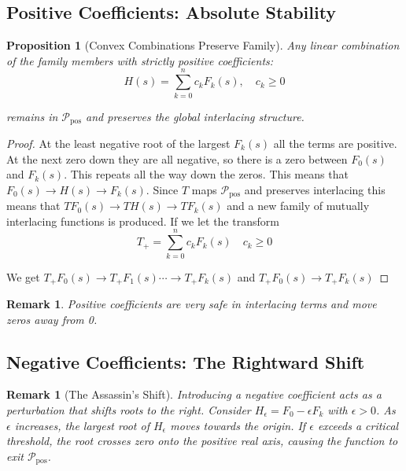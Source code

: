 \documentclass[11pt]{article}
\theoremstyle{breakdef}
\newtheorem{remark}[theorem]{Remark}
\newtheorem{proposition}[theorem]{Proposition}
\begin{document}
\subsection{Positive Coefficients: Absolute Stability}
\begin{proposition}[Convex Combinations Preserve Family]
Any linear combination of the family members with strictly positive coefficients:
\begin{equation}
H(s) = \sum_{k=0}^n c_k F_k(s), \quad c_k \ge 0
\end{equation}

remains in $\mathcal{P}_{\mathrm{pos}}$ and preserves the global interlacing structure.
\end{proposition}
\begin{proof}
At the least negative root of the largest $F_k(s)$ all the terms are positive.  At the next zero down they are all negative, so there is a zero between $F_0(s)$ and $F_k(s)$.  This repeats all the way down the zeros.  This means that $F_0(s) \to H(s) \to F_k(s)$.  Since $T$ maps $\mathcal{P}_{\mathrm{pos}}$ and preserves interlacing this means that $T F_0(s) \to T H(s) \to T F_k(s)$ and a new family of mutually interlacing functions is produced.  If we let the transform
\begin{equation}
T_{+} = \sum_{k=0}^n c_k F_k(s) \quad c_k \ge 0
\end{equation}

We get $T_{+} F_0(s) \to T_{+} F_1(s) \cdots \to T_{+} F_k(s)$
and  $T_{+} F_0(s) \to T_{+} F_k(s)$

\end{proof}
\begin{remark}
Positive coefficients are very safe in interlacing terms and move zeros away from 0.
\end{remark}

\subsection{Negative Coefficients: The Rightward Shift}
\begin{remark}[The Assassin's Shift]
Introducing a negative coefficient acts as a perturbation that shifts roots to the right. 
Consider $H_\epsilon = F_0 - \epsilon F_k$ with $\epsilon > 0$. 
As $\epsilon$ increases, the largest root of $H_\epsilon$ moves towards the origin. If $\epsilon$ exceeds a critical threshold, the root crosses zero onto the positive real axis, causing the function to exit $\mathcal{P}_{\mathrm{pos}}$.
\end{remark}
\end{document}
